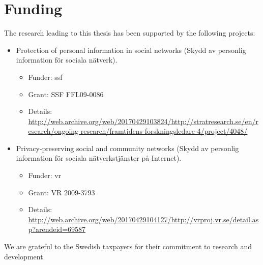 \section*{Funding}
The research leading to this thesis has been supported by the following projects:
\begin{itemize}
    \item Protection of personal information in social networks (Skydd av personlig 
    information f{\"o}r sociala n{\"a}tverk).
        \begin{itemize}
            \item Funder: \acf*{ssf}
            \item Grant: SSF FFL09-0086
            \item Details: \url{http://web.archive.org/web/20170429103824/http://stratresearch.se/en/research/ongoing-research/framtidens-forskningsledare-4/project/4048/}
        \end{itemize}
        
    \item Privacy-preserving social and community networks (Skydd av personlig information 
    f{\"o}r sociala n{\"a}tverkstj{\"a}nster p{\aa} Internet).
        \begin{itemize}
            \item Funder: \acf*{vr}
            \item Grant: VR 2009-3793
            \item Details: \url{http://web.archive.org/web/20170429104127/http://vrproj.vr.se/detail.asp?arendeid=69587}
        \end{itemize}
\end{itemize}

We are grateful to the Swedish taxpayers for their commitment to research and development.
